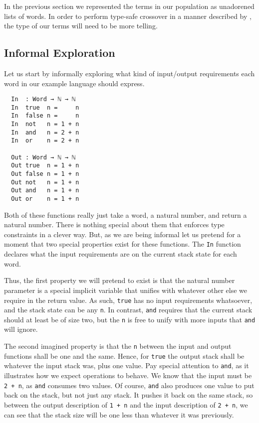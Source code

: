 \documentclass{acm_proc_article-sp}
\begin{document}
In the previous section we represented the terms in our population as
unadorened lists of words. In order to perform type-safe crossover in
a manner described by \cite{tchernev:forthcross}, the type of our
terms will need to be more telling.

\subsection{Informal Exploration}

Let us start by informally exploring what kind of input/output
requirements each word in our example language should express. 

\begin{verbatim}
  In  : Word → ℕ → ℕ
  In  true  n =     n
  In  false n =     n
  In  not   n = 1 + n
  In  and   n = 2 + n
  In  or    n = 2 + n

  Out : Word → ℕ → ℕ
  Out true  n = 1 + n
  Out false n = 1 + n
  Out not   n = 1 + n
  Out and   n = 1 + n
  Out or    n = 1 + n
\end{verbatim}

Both of these functions really just take a word, a natural number, and
return a natural number. There is nothing special about them that
enforces type constraints in a clever way. But, as we are being
informal let us pretend for a moment that two special properties exist
for these functions. The \texttt{In} function declares what the input
requirements are on the current stack state for each word.

Thus, the first property we will pretend to exist is that the natural number
parameter is a special implicit variable that unifies with whatever
other else we require in the return value. As such, \texttt{true} has
no input requirements whatsoever, and the stack state can be any
\texttt{n}. In contrast, \texttt{and} requires that the current stack
should at least be of size two, but the \texttt{n} is free to unify
with more inputs that \texttt{and} will ignore.

The second imagined property is that the \texttt{n} between the input
and output functions shall be one and the same. Hence, for
\texttt{true} the output stack shall be whatever the input stack was,
plus one value. Pay special attention to \texttt{and}, as it
illustrates how we expect operations to behave. We know that the input
must be \texttt{2 + n}, as \texttt{and} consumes two values. Of
course, \texttt{and} also produces one value to put back on the
stack, but not just any stack. It pushes it back on the same stack, so
between the output description of \texttt{1 + n} and the input
description of \texttt{2 + n}, we can see that the stack size will be
one less than whatever it was previously.
\end{document}
